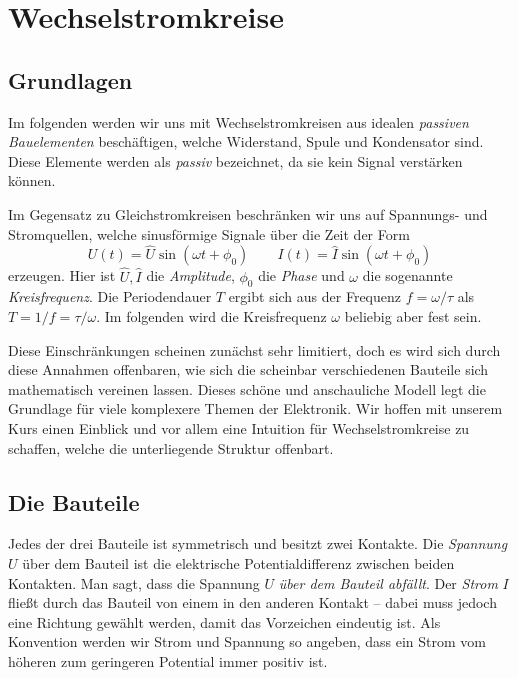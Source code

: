\section{Wechselstromkreise}
\subsection{Grundlagen}
Im folgenden werden wir uns mit Wechselstromkreisen aus idealen \emph{passiven Bauelementen} beschäftigen, welche Widerstand, Spule und Kondensator sind. Diese Elemente werden als \emph{passiv} bezeichnet, da sie kein Signal verstärken können.

Im Gegensatz zu Gleichstromkreisen beschränken wir uns auf Spannungs- und Stromquellen, welche sinusförmige Signale über die Zeit der Form
\begin{equation}\label{eq:sinusform}
    U(t) = \hat U\sin(\omega t + \phi_0) \qquad
    I(t) = \hat I\sin(\omega t + \phi_0)
\end{equation}
erzeugen. Hier ist $\hat U, \hat I$ die \emph{Amplitude}, $\phi_0$ die \emph{Phase} und  $\omega$ die sogenannte \emph{Kreisfrequenz}. Die Periodendauer $T$ ergibt sich aus der Frequenz $f = \omega/\tau$ als $T = 1/f = \tau/\omega$.
Im folgenden wird die Kreisfrequenz $\omega$ beliebig aber fest sein.

Diese Einschränkungen scheinen zunächst sehr limitiert, doch es wird sich durch diese Annahmen offenbaren, wie sich die scheinbar verschiedenen Bauteile sich mathematisch vereinen lassen. Dieses schöne und anschauliche Modell legt die Grundlage für viele komplexere Themen der Elektronik. Wir hoffen mit unserem Kurs einen Einblick und vor allem eine Intuition für Wechselstromkreise zu schaffen, welche die unterliegende Struktur offenbart.

\subsection{Die Bauteile}
Jedes der drei Bauteile ist symmetrisch und besitzt zwei Kontakte. Die \emph{Spannung} $U$ über dem Bauteil ist die elektrische Potentialdifferenz zwischen beiden Kontakten. Man sagt, dass die Spannung $U$ \emph{über dem Bauteil abfällt}. Der \emph{Strom} $I$ fließt durch das Bauteil von einem in den anderen Kontakt -- dabei muss jedoch eine Richtung gewählt werden, damit das Vorzeichen eindeutig ist. Als Konvention werden wir Strom und Spannung so angeben, dass ein Strom vom höheren zum geringeren Potential immer positiv ist.

